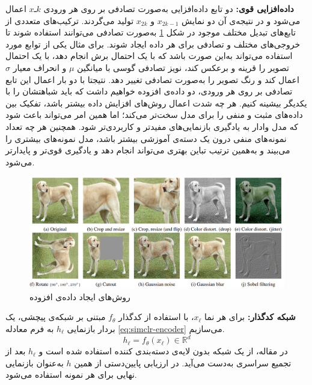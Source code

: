 \noindent\textbf{داده‌افزایی قوی:}
دو تابع داده‌افزایی به‌صورت تصادفی بر روی هر ورودی $xـk$
اعمال می‌شود و در نتیجه‌ی آن دو نمایش
$x_{2k-1}$ و $x_{2k}$ تولید می‌گردند.
ترکیب‌های متعددی از تابع‌های تبدیل مختلف موجود در شکل
\ref{fig:simclr-augmentations}
به‌صورت تصادفی می‌توانند استفاده شوند تا خروجی‌های مختلف و تصادفی برای هر داده ایجاد شوند. برای مثال یکی از توابع مورد استفاده می‌تواند به‌این صورت باشد که با یک احتمال برش انجام دهد، با یک احتمال تصویر را قرینه و برعکس کند، نویز تصادفی گوسی با میانگین
$\mu$ و انحراف معیار $\sigma$
اعمال کند و رنگ تصویر را به‌صورت تصادفی تغییر دهد. نتیجتا با دو بار اعمال این تابع تصادفی بر روی هر ورودی، دو داده‌ی افزوده خواهیم داشت که باید شباهتشان را با یکدیگر بیشینه کنیم. هر چه شدت اعمال روش‌های افزایش داده بیشتر باشد، تفکیک بین داده‌های مثبت و منفی را برای مدل سخت‌تر می‌کند؛ اما همین امر می‌تواند باعث شود که مدل وادار به یادگیری بازنمایی‌های مفیدتر و کاربردی‌تر شود. همچنین هر چه تعداد نمونه‌های منفی درون یک دسته‌ی آموزشی بیشتر باشد، مدل نمونه‌های بیشتری را می‌بیند و به‌همین ترتیب تباین بهتری می‌تواند انجام دهد و یادگیری قوی‌تر و پایدارتر می‌شود.
\begin{figure}[t!]
\centering
\includegraphics[width=1\textwidth]{Images/Chapter2/simclr-augmentations.png}
\caption{روش‌های ایجاد داده‌ی افزوده}
\label{fig:simclr-augmentations}
\end{figure}

\noindent\textbf{شبکه کدگذار:}
برای هر نما $x_\ell$،
با استفاده از کدگذار $f_\theta$ مبتنی بر شبکه‌ی پیچشی،
یک بردار بازنمایی $h_\ell$
به فرم معادله \ref{eq:simclr-encoder} می‌سازیم.
\begin{equation}
\label{eq:simclr-encoder}
h_\ell = f_\theta(x_\ell)\in\mathbb{R}^d
\end{equation}
در مقاله، از یک شبکه 
بدون لایه‌ی دسته‌بندی کننده استفاده شده است و
$h_\ell$
بعد از تجمیع سراسری به‌دست می‌آید. در ارزیابی پایین‌دستی از همین $h$
به‌عنوان بازنمایی نهایی برای هر نمونه استفاده می‌شود.

